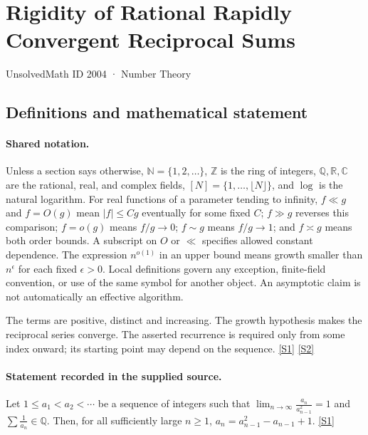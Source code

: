 \documentclass[11pt,a4paper]{article}
\newcommand{\N}{\mathbb{N}}
\newcommand{\Z}{\mathbb{Z}}
\newcommand{\Q}{\mathbb{Q}}
\newcommand{\R}{\mathbb{R}}
\newcommand{\C}{\mathbb{C}}
\newcommand{\sref}[2]{\hyperlink{source:#1:#2}{[S#2]}}
\begin{document}

\setcounter{section}{2003}

\section{Rigidity of Rational Rapidly Convergent Reciprocal Sums}\label{2004}

{\small\sffamily UnsolvedMath ID 2004 · Number Theory}

\subsection{Definitions and mathematical statement}

\paragraph{Shared notation.}Unless a section says otherwise, $\N=\{1,2,\ldots\}$,
$\Z$ is the ring of integers, $\Q,\R,\C$ are the rational, real, and complex
fields, $[N]=\{1,\ldots,\lfloor N\rfloor\}$, and $\log$ is the natural
logarithm. For real functions of a parameter tending to infinity,
$f\ll g$ and $f=O(g)$ mean $|f|\leq Cg$ eventually for some fixed $C$;
$f\gg g$ reverses this comparison; $f=o(g)$ means $f/g\to0$;
$f\sim g$ means $f/g\to1$; and $f\asymp g$ means both order bounds.
A subscript on $O$ or $\ll$ specifies allowed constant dependence.
The expression $n^{o(1)}$ in an upper bound means growth smaller than
$n^\epsilon$ for each fixed $\epsilon>0$. Local definitions govern any
exception, finite-field convention, or use of the same symbol for another
object. An asymptotic claim is not automatically an effective algorithm.



The terms are positive, distinct and increasing. The growth hypothesis makes the reciprocal series converge. The asserted recurrence is required only from some index onward; its starting point may depend on the sequence. \sref{2004}{1} \sref{2004}{2}

\paragraph{Statement recorded in the supplied source.}
Let $1\leq a_1<a_2<\cdots$ be a sequence of integers such that $ \lim_{n\to \infty}\frac{a_n}{a_{n-1}^2}=1 $ and $\sum\frac{1}{a_n}\in \mathbb{Q}$. Then, for all sufficiently large $n\geq 1$, $  a_n = a_{n-1}^2-a_{n-1}+1. $ \sref{2004}{1}
\end{document}
